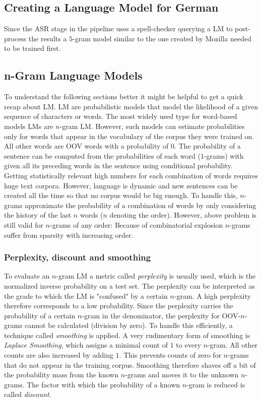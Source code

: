 \subsection{Creating a Language Model for German}

Since the \ac{ASR} stage in the pipeline uses a spell-checker querying a \ac{LM} to post-process the results a $5$-gram model similar to the one created by Mozilla needed to be trained first.

\subsection{n-Gram Language Models}

To understand the following sections better it might be helpful to get a quick recap about \ac{LM}. \ac{LM} are probabilistic models that model the likelihood of a given sequence of characters or words. The most widely used type for word-based models \ac{LM}s are $n$-gram \ac{LM}. However, such models can estimate probabilities only for words that appear in the vocabulary of the corpus they were trained on. All other words are \ac{OOV} words with a probability of $0$. The probability of a sentence can be computed from the probabilities of each word ($1$-grams) with given all its preceding words in the sentence using conditional probability. Getting statistically relevant high numbers for each combination of words requires huge text corpora. However, language is dynamic and new sentences can be created all the time so that no corpus would be big enough. To handle this, $n$-grams approximate the probability of a combination of words by only considering the history of the last $n$ words ($n$ denoting the order). However, above problem is still valid for $n$-grams of any order: Because of combinatorial explosion $n$-grams suffer from sparsity with increasing order. 

\subsubsection{Perplexity, discount and smoothing}

To evaluate an $n$-gram \ac{LM} a metric called \textit{perplexity} is usually used, which is the normalized inverse probability on a test set. The perplexity can be interpreted as the grade to which the \ac{LM} is "confused" by a certain $n$-gram. A high perplexity therefore corresponds to a low probability. Since the perplexity carries the probability of a certain $n$-gram in the denominator, the perplexity for \ac{OOV}-$n$-grams cannot be calculated (division by zero). To handle this efficiently, a technique called \textit{smoothing} is applied. A very rudimentary form of smoothing is \textit{Laplace Smoothing}, which assigns a minimal count of $1$ to every $n$-gram. All other counts are also increased by adding $1$. This prevents counts of zero for $n$-grams that do not appear in the training corpus. Smoothing therefore shaves off a bit of the probability mass from the known $n$-grams and moves it to the unknown $n$-grams. The factor with which the probability of a known $n$-gram is reduced is called \textit{discount}. 


